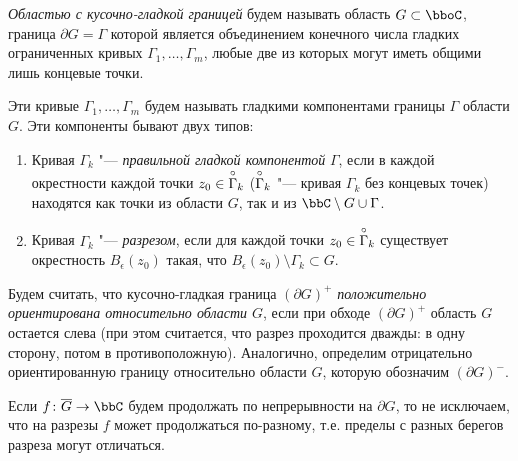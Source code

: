 \begin{defn} \label{ch33defn1}
\textit{Областью с кусочно-гладкой границей} будем называть область $G \subset \bboC$, граница $\partial G=\Gamma$ которой является объединением конечного числа гладких ограниченных кривых $\Gamma_1 , \dots , \Gamma_m$, любые две из которых могут иметь общими лишь концевые точки. 

Эти кривые $\Gamma_1 , \dots , \Gamma_m$ будем называть гладкими компонентами границы $\Gamma$ области $G$. Эти компоненты бывают двух типов:
\end{defn}

\begin{enumerate}
\item
Кривая $\Gamma_k$ "--- \textit{правильной гладкой компонентой} $\Gamma$, если в каждой окрестности каждой точки $z_0 \in \;\buildrel\circ\over\Gamma_k$ ($\buildrel\circ\over\Gamma_k$ "--- кривая $\Gamma_k$ без концевых точек) находятся как точки из области $G$, так и из $\bbC \setminus G\cup\Gamma$. 

\item
Кривая $\Gamma_k$ "--- \textit{разрезом}, если для каждой точки $z_0 \in\; \buildrel\circ\over\Gamma_k$ существует окрестность $B_\epsilon(z_0)$ такая, что $B_\epsilon(z_0)\setminus\Gamma_k \subset G$.
\end{enumerate}
\begin{defn} \label{ch33defn2} 
Будем считать, что кусочно-гладкая граница $(\partial G)^{+}$ \textit{положительно ориентирована относительно области $G$}, если при обходе $(\partial G)^{+}$ область $G$ остается слева (при этом считается, что разрез проходится дважды: в одну сторону, потом в противоположную). Аналогично, определим отрицательно ориентированную границу относительно области $G$, которую обозначим $(\partial G)^{-}.$
\end{defn}

Если $f\colon\overline{G}\to\bbC$ будем продолжать по непрерывности на $\partial G$, то не исключаем, что на разрезы $f$ может продолжаться по-разному, т.е. пределы с разных берегов разреза могут отличаться. 

